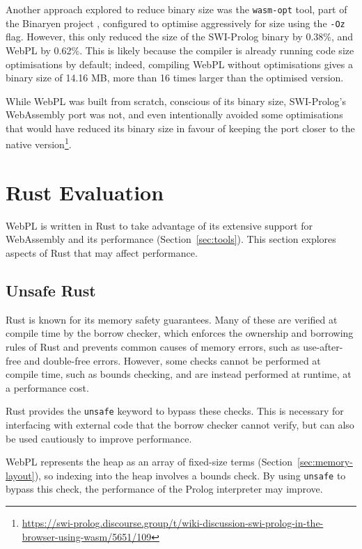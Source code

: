\vspace*{-1.5em}

Another approach explored to reduce binary size was the \texttt{wasm-opt} tool, part of the Binaryen project \cite{zakaiBinaryenhttpsgithubcom2015}, configured to optimise aggressively for size using the \texttt{-Oz} flag. However, this only reduced the size of the SWI-Prolog binary by 0.38\%, and WebPL by 0.62\%. This is likely because the compiler is already running code size optimisations by default; indeed, compiling WebPL without optimisations gives a binary size of 14.16 MB, more than 16 times larger than the optimised version.

While WebPL was built from scratch, conscious of its binary size, SWI-Prolog's WebAssembly port was not, and even intentionally avoided some optimisations that would have reduced its binary size in favour of keeping the port closer to the native version\footnote{\url{https://swi-prolog.discourse.group/t/wiki-discussion-swi-prolog-in-the-browser-using-wasm/5651/109}}.

\section{Rust Evaluation}

\label{sec:rust-evaluation}

WebPL is written in Rust to take advantage of its extensive support for WebAssembly and its performance (Section~\ref{sec:tools}). This section explores aspects of Rust that may affect performance.

\subsection{Unsafe Rust}

Rust is known for its memory safety guarantees. Many of these are verified at compile time by the borrow checker, which enforces the ownership and borrowing rules of Rust and prevents common causes of memory errors, such as use-after-free and double-free errors. However, some checks cannot be performed at compile time, such as bounds checking, and are instead performed at runtime, at a performance cost.

Rust provides the \texttt{unsafe} keyword to bypass these checks. This is necessary for interfacing with external code that the borrow checker cannot verify, but can also be used cautiously to improve performance.

WebPL represents the heap as an array of fixed-size terms (Section~\ref{sec:memory-layout}), so indexing into the heap involves a bounds check. By using \texttt{unsafe} to bypass this check, the performance of the Prolog interpreter may improve.

